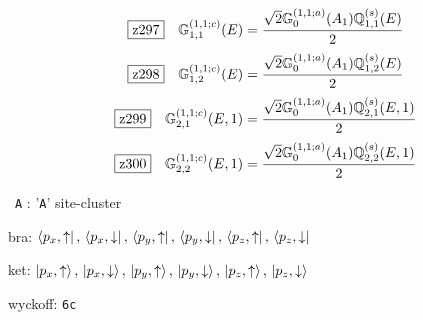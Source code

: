 \documentclass[fleqn,10pt,landscape]{jsarticle}
\begin{document}
\begin{dmath*}
\hspace*{3mm}\fbox{z297}\quad \mathbb{G}_{1,1}^{(1,1;c)}(E)=\frac{\sqrt{2} \mathbb{G}_{0}^{(1,1;a)}(A_{1}) \mathbb{Q}_{1,1}^{(s)}(E)}{2}
\end{dmath*}
\begin{dmath*}
\hspace*{3mm}\fbox{z298}\quad \mathbb{G}_{1,2}^{(1,1;c)}(E)=\frac{\sqrt{2} \mathbb{G}_{0}^{(1,1;a)}(A_{1}) \mathbb{Q}_{1,2}^{(s)}(E)}{2}
\end{dmath*}
\begin{dmath*}
\hspace*{3mm}\fbox{z299}\quad \mathbb{G}_{2,1}^{(1,1;c)}(E,1)=\frac{\sqrt{2} \mathbb{G}_{0}^{(1,1;a)}(A_{1}) \mathbb{Q}_{2,1}^{(s)}(E,1)}{2}
\end{dmath*}
\begin{dmath*}
\hspace*{3mm}\fbox{z300}\quad \mathbb{G}_{2,2}^{(1,1;c)}(E,1)=\frac{\sqrt{2} \mathbb{G}_{0}^{(1,1;a)}(A_{1}) \mathbb{Q}_{2,2}^{(s)}(E,1)}{2}
\end{dmath*}
\vspace{5mm}

\noindent\textbullet\, \texttt{A} : '\texttt{A}' site-cluster

\noindent\quad * bra: $\bra{p_{x},\uparrow},\, \bra{p_{x},\downarrow},\, \bra{p_{y},\uparrow},\, \bra{p_{y},\downarrow},\, \bra{p_{z},\uparrow},\, \bra{p_{z},\downarrow}$

\noindent\quad * ket: $\ket{p_{x},\uparrow},\, \ket{p_{x},\downarrow},\, \ket{p_{y},\uparrow},\, \ket{p_{y},\downarrow},\, \ket{p_{z},\uparrow},\, \ket{p_{z},\downarrow}$

\noindent\quad * wyckoff: \texttt{6c}
\end{document}
